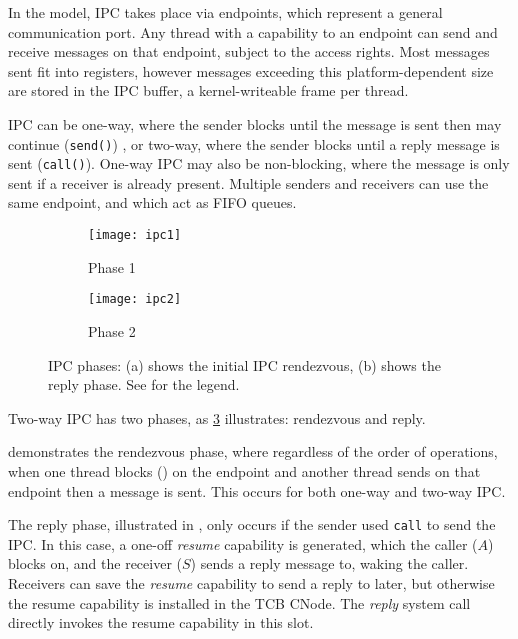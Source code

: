 In the \selfour model,
\gls{IPC} takes place via endpoints, which represent a general communication port. Any thread with a
capability to an endpoint can send and receive messages on that endpoint, subject to the access
rights. Most messages sent fit into registers, however messages exceeding this platform-dependent
size are stored in the \gls{IPC} buffer, a kernel-writeable frame per
thread. 

IPC can be one-way, where the sender blocks until the message is sent then may continue
(\texttt{send()}) , or two-way,
where the sender blocks until a reply message is sent (\texttt{call()}). One-way IPC may also be
non-blocking, where the message is only sent if a receiver is already present.
Multiple senders and receivers can use the same endpoint, and which act as \gls{FIFO}
queues. 

\begin{figure}
    \centering
    \begin{subfigure}[h]{0.48\textwidth}
        \centering
        \texttt{[image: ipc1]}
        \caption{Phase 1}
        \label{f:ipc1}
    \end{subfigure}%
    \begin{subfigure}[h]{0.48\textwidth}
        \centering
        \texttt{[image: ipc2]}
        \caption{Phase 2}
        \label{f:ipc2}
    \end{subfigure}
    \caption{IPC phases: (a) shows the initial IPC rendezvous, (b) shows the
    reply phase. See  for the legend.}
    \label{f:ipc}
\end{figure}

Two-way IPC has two phases, as \cref{f:ipc} illustrates: rendezvous and reply.

 demonstrates the rendezvous phase, where regardless of the order of operations, 
when one thread blocks () on the endpoint and another thread sends on that endpoint
then a message is sent. This occurs for both one-way and two-way \gls{IPC}.

The reply phase, illustrated in , only occurs if the sender used \texttt{call} to send
the \gls{IPC}. In this case, a one-off \emph{resume} capability is generated, which the caller ($A$)
blocks on, and the receiver ($S$) sends a reply message to, waking the caller. Receivers can save
the \emph{resume} capability to send a reply to later, but otherwise the resume capability is
installed in the \gls{TCB} CNode. The \emph{reply} system call directly invokes the resume
capability in this slot. 

